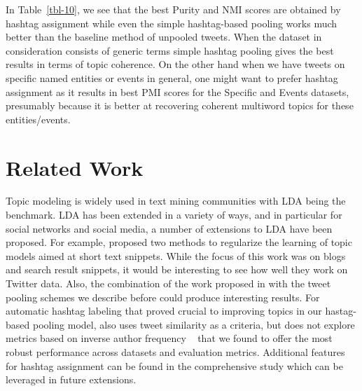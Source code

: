 \documentclass[10pt,a5paper,twoside]{article}
\begin{document}
In Table~\ref{tbl-10}, we see that the best Purity and NMI scores are obtained by hashtag assignment while even the simple hashtag-based pooling works much better than the baseline method of unpooled tweets. When the dataset in consideration consists of generic terms simple hashtag pooling gives the best results in terms of topic coherence. On the other hand when we have tweets on specific named entities or events in general, one might want to prefer hashtag assignment as it results in best PMI scores for the Specific and Events datasets, presumably because it is better at recovering coherent multiword topics for these entities/events.

\section{Related Work}

\label{sec:related_work}
Topic modeling is widely used in text mining communities with LDA
being the benchmark.  LDA has been extended in a variety of ways, and
in particular for social networks and social media, a number of
extensions to LDA have been proposed.  For example, \cite{newman11}
proposed two methods to regularize the learning of topic models aimed
at short text snippets. While the focus of this work was on blogs and
search result snippets, it would be interesting to see how well they
work on Twitter data.  Also, the combination of the work proposed in
\cite{newman11} with the tweet pooling schemes we describe before
could produce interesting results. For automatic
 hashtag labeling that proved crucial to improving topics in our hastag-based pooling model, \cite{zangerle2011recommending} also uses tweet similarity as a
criteria, but does not explore metrics based on inverse author
frequency ~\cite{iaf} that we found to offer the most robust
performance across datasets and evaluation metrics. Additional features  for hashtag assignment can be found in the comprehensive study \cite{yang2012www} which can be leveraged in future extensions.
\end{document}
